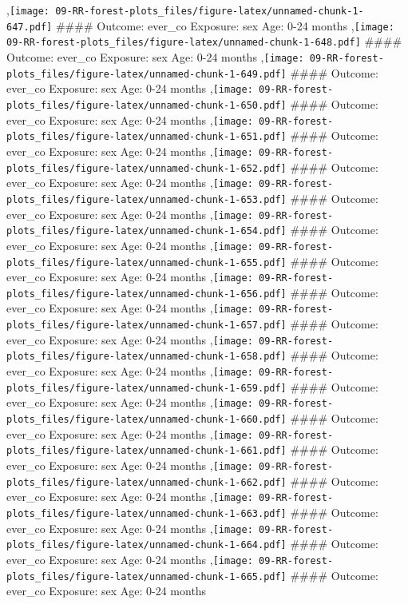 \documentclass[
  9pt,
]{book}
\begin{document}
,\texttt{[image: 09-RR-forest-plots\_files/figure-latex/unnamed-chunk-1-647.pdf]}
\#\#\#\# Outcome: ever\_co Exposure: sex Age: 0-24 months
,\texttt{[image: 09-RR-forest-plots\_files/figure-latex/unnamed-chunk-1-648.pdf]}
\#\#\#\# Outcome: ever\_co Exposure: sex Age: 0-24 months
,\texttt{[image: 09-RR-forest-plots\_files/figure-latex/unnamed-chunk-1-649.pdf]}
\#\#\#\# Outcome: ever\_co Exposure: sex Age: 0-24 months
,\texttt{[image: 09-RR-forest-plots\_files/figure-latex/unnamed-chunk-1-650.pdf]}
\#\#\#\# Outcome: ever\_co Exposure: sex Age: 0-24 months
,\texttt{[image: 09-RR-forest-plots\_files/figure-latex/unnamed-chunk-1-651.pdf]}
\#\#\#\# Outcome: ever\_co Exposure: sex Age: 0-24 months
,\texttt{[image: 09-RR-forest-plots\_files/figure-latex/unnamed-chunk-1-652.pdf]}
\#\#\#\# Outcome: ever\_co Exposure: sex Age: 0-24 months
,\texttt{[image: 09-RR-forest-plots\_files/figure-latex/unnamed-chunk-1-653.pdf]}
\#\#\#\# Outcome: ever\_co Exposure: sex Age: 0-24 months
,\texttt{[image: 09-RR-forest-plots\_files/figure-latex/unnamed-chunk-1-654.pdf]}
\#\#\#\# Outcome: ever\_co Exposure: sex Age: 0-24 months
,\texttt{[image: 09-RR-forest-plots\_files/figure-latex/unnamed-chunk-1-655.pdf]}
\#\#\#\# Outcome: ever\_co Exposure: sex Age: 0-24 months
,\texttt{[image: 09-RR-forest-plots\_files/figure-latex/unnamed-chunk-1-656.pdf]}
\#\#\#\# Outcome: ever\_co Exposure: sex Age: 0-24 months
,\texttt{[image: 09-RR-forest-plots\_files/figure-latex/unnamed-chunk-1-657.pdf]}
\#\#\#\# Outcome: ever\_co Exposure: sex Age: 0-24 months
,\texttt{[image: 09-RR-forest-plots\_files/figure-latex/unnamed-chunk-1-658.pdf]}
\#\#\#\# Outcome: ever\_co Exposure: sex Age: 0-24 months
,\texttt{[image: 09-RR-forest-plots\_files/figure-latex/unnamed-chunk-1-659.pdf]}
\#\#\#\# Outcome: ever\_co Exposure: sex Age: 0-24 months
,\texttt{[image: 09-RR-forest-plots\_files/figure-latex/unnamed-chunk-1-660.pdf]}
\#\#\#\# Outcome: ever\_co Exposure: sex Age: 0-24 months
,\texttt{[image: 09-RR-forest-plots\_files/figure-latex/unnamed-chunk-1-661.pdf]}
\#\#\#\# Outcome: ever\_co Exposure: sex Age: 0-24 months
,\texttt{[image: 09-RR-forest-plots\_files/figure-latex/unnamed-chunk-1-662.pdf]}
\#\#\#\# Outcome: ever\_co Exposure: sex Age: 0-24 months
,\texttt{[image: 09-RR-forest-plots\_files/figure-latex/unnamed-chunk-1-663.pdf]}
\#\#\#\# Outcome: ever\_co Exposure: sex Age: 0-24 months
,\texttt{[image: 09-RR-forest-plots\_files/figure-latex/unnamed-chunk-1-664.pdf]}
\#\#\#\# Outcome: ever\_co Exposure: sex Age: 0-24 months
,\texttt{[image: 09-RR-forest-plots\_files/figure-latex/unnamed-chunk-1-665.pdf]}
\#\#\#\# Outcome: ever\_co Exposure: sex Age: 0-24 months
\end{document}
